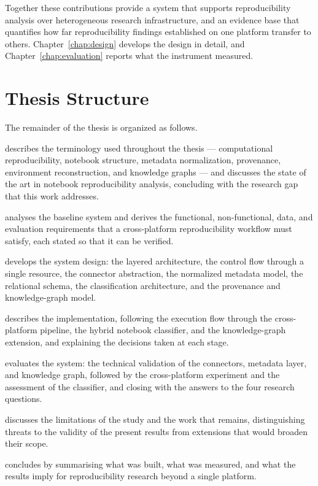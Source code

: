 Together these contributions provide a system that supports reproducibility analysis over heterogeneous research infrastructure, and an evidence base that quantifies how far reproducibility findings established on one platform transfer to others. Chapter~\ref{chap:design} develops the design in detail, and Chapter~\ref{chap:evaluation} reports what the instrument measured.

\section{Thesis Structure}
\label{sec:thesis-structure}

The remainder of the thesis is organized as follows.

\begin{description}[leftmargin=2.25cm,labelwidth=1.95cm,style=multiline]
  \item[\textbf{Chapter 2}] describes the terminology used throughout the thesis --- computational reproducibility, notebook structure, metadata normalization, provenance, environment reconstruction, and knowledge graphs --- and discusses the state of the art in notebook reproducibility analysis, concluding with the research gap that this work addresses.
  \item[\textbf{Chapter 3}] analyses the baseline system and derives the functional, non-functional, data, and evaluation requirements that a cross-platform reproducibility workflow must satisfy, each stated so that it can be verified.
  \item[\textbf{Chapter 4}] develops the system design: the layered architecture, the control flow through a single resource, the connector abstraction, the normalized metadata model, the relational schema, the classification architecture, and the provenance and knowledge-graph model.
  \item[\textbf{Chapter 5}] describes the implementation, following the execution flow through the cross-platform pipeline, the hybrid notebook classifier, and the knowledge-graph extension, and explaining the decisions taken at each stage.
  \item[\textbf{Chapter 6}] evaluates the system: the technical validation of the connectors, metadata layer, and knowledge graph, followed by the cross-platform experiment and the assessment of the classifier, and closing with the answers to the four research questions.
  \item[\textbf{Chapter 7}] discusses the limitations of the study and the work that remains, distinguishing threats to the validity of the present results from extensions that would broaden their scope.
  \item[\textbf{Chapter 8}] concludes by summarising what was built, what was measured, and what the results imply for reproducibility research beyond a single platform.
\end{description}
